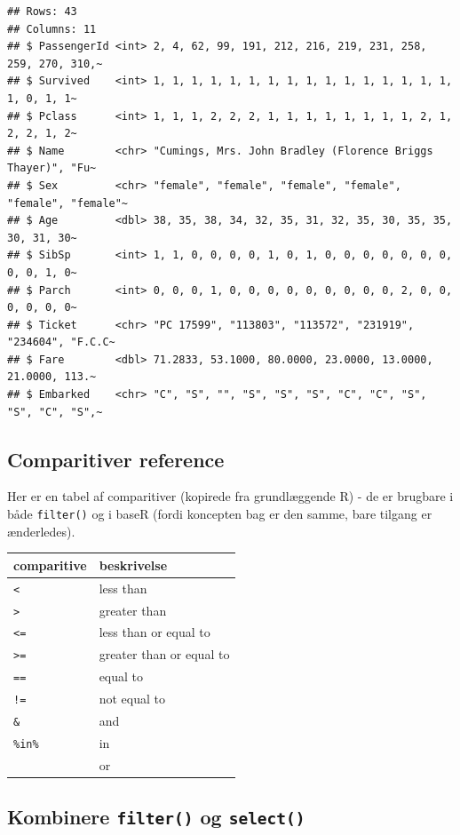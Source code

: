 \documentclass[
]{book}
\begin{document}
\begin{verbatim}
## Rows: 43
## Columns: 11
## $ PassengerId <int> 2, 4, 62, 99, 191, 212, 216, 219, 231, 258, 259, 270, 310,~
## $ Survived    <int> 1, 1, 1, 1, 1, 1, 1, 1, 1, 1, 1, 1, 1, 1, 1, 1, 1, 0, 1, 1~
## $ Pclass      <int> 1, 1, 1, 2, 2, 2, 1, 1, 1, 1, 1, 1, 1, 1, 2, 1, 2, 2, 1, 2~
## $ Name        <chr> "Cumings, Mrs. John Bradley (Florence Briggs Thayer)", "Fu~
## $ Sex         <chr> "female", "female", "female", "female", "female", "female"~
## $ Age         <dbl> 38, 35, 38, 34, 32, 35, 31, 32, 35, 30, 35, 35, 30, 31, 30~
## $ SibSp       <int> 1, 1, 0, 0, 0, 0, 1, 0, 1, 0, 0, 0, 0, 0, 0, 0, 0, 0, 1, 0~
## $ Parch       <int> 0, 0, 0, 1, 0, 0, 0, 0, 0, 0, 0, 0, 0, 2, 0, 0, 0, 0, 0, 0~
## $ Ticket      <chr> "PC 17599", "113803", "113572", "231919", "234604", "F.C.C~
## $ Fare        <dbl> 71.2833, 53.1000, 80.0000, 23.0000, 13.0000, 21.0000, 113.~
## $ Embarked    <chr> "C", "S", "", "S", "S", "S", "C", "C", "S", "S", "C", "S",~
\end{verbatim}

\hypertarget{comparitiver-reference}{%
\subsection{Comparitiver reference}\label{comparitiver-reference}}

Her er en tabel af comparitiver (kopirede fra grundlæggende R) - de er brugbare i både \texttt{filter()} og i baseR (fordi koncepten bag er den samme, bare tilgang er ænderledes).

\begin{longtable}[]{@{}ll@{}}
\toprule
comparitive & beskrivelse \\
\midrule
\endhead
\texttt{\textless{}} & less than \\
\texttt{\textgreater{}} & greater than \\
\texttt{\textless{}=} & less than or equal to \\
\texttt{\textgreater{}=} & greater than or equal to \\
\texttt{==} & equal to \\
\texttt{!=} & not equal to \\
\texttt{\&} & and \\
\texttt{\%in\%} & in \\
\texttt{\textbar{}} & or \\
\bottomrule
\end{longtable}

\hypertarget{kombinere-filter-og-select}{%
\subsection{\texorpdfstring{Kombinere \texttt{filter()} og \texttt{select()}}{Kombinere filter() og select()}}\label{kombinere-filter-og-select}}
\end{document}
